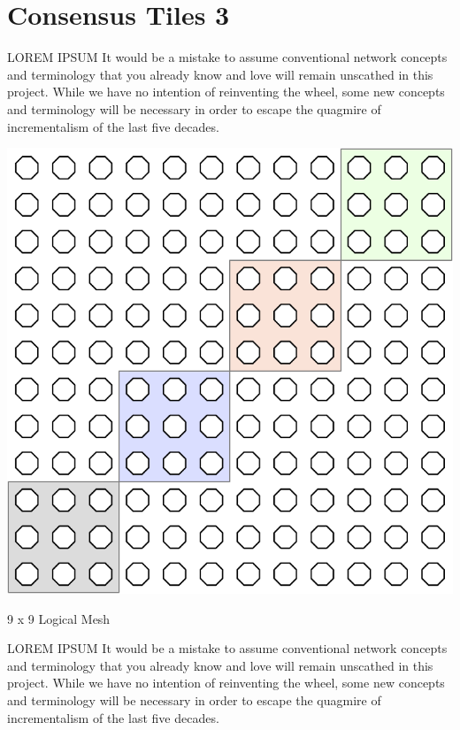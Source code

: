 \section{Consensus Tiles 3}

LOREM IPSUM It would be a mistake to assume conventional network concepts and terminology that you already know and love will remain unscathed in this project. While we have no intention of reinventing the wheel,  some new concepts and terminology will be necessary in order to escape the quagmire of incrementalism of the last five decades.  

 \begin{marginfigure}
  \includegraphics[width=1.0\linewidth]{../../FIGURES/tensor-tile-12x12.pdf}
   \caption{\vspace{-8em} 9 x 9 Logical Mesh }
      \vspace{2em}
\end{marginfigure}

LOREM IPSUM It would be a mistake to assume conventional network concepts and terminology that you already know and love will remain unscathed in this project. While we have no intention of reinventing the wheel,  some new concepts and terminology will be necessary in order to escape the quagmire of incrementalism of the last five decades.  

